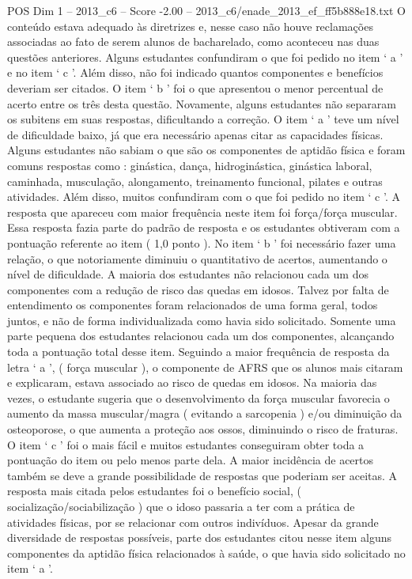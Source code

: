 \begin{textsample}{POS Dim 1 – 2013\_c6 – Score -2.00 – 2013\_c6/enade\_2013\_ef\_ff5b888e18.txt}
O conteúdo estava adequado às diretrizes e, nesse caso não houve reclamações associadas ao fato de serem alunos de bacharelado, como aconteceu nas duas questões anteriores.
Alguns estudantes confundiram o que foi pedido no item ‘ a ’ e no item ‘ c ’.
Além disso, não foi indicado quantos componentes e benefícios deveriam ser citados.
O item ‘ b ’ foi o que apresentou o menor percentual de acerto entre os três desta questão.
Novamente, alguns estudantes não separaram os subitens em suas respostas, dificultando a correção.
O item ‘ a ’ teve um nível de dificuldade baixo, já que era necessário apenas citar as capacidades físicas.
Alguns estudantes não sabiam o que são os componentes de aptidão física e foram comuns respostas como : ginástica, dança, hidroginástica, ginástica laboral, caminhada, musculação, alongamento, treinamento funcional, pilates e outras atividades.
Além disso, muitos confundiram com o que foi pedido no item ‘ c ’.
A resposta que apareceu com maior frequência neste item foi força/força muscular.
Essa resposta fazia parte do padrão de resposta e os estudantes obtiveram com a pontuação referente ao item ( 1,0 ponto ).
No item ‘ b ’ foi necessário fazer uma relação, o que notoriamente diminuiu o quantitativo de acertos, aumentando o nível de dificuldade.
A maioria dos estudantes não relacionou cada um dos componentes com a redução de risco das quedas em idosos.
Talvez por falta de entendimento os componentes foram relacionados de uma forma geral, todos juntos, e não de forma individualizada como havia sido solicitado.
Somente uma parte pequena dos estudantes relacionou cada um dos componentes, alcançando toda a pontuação total desse item.
Seguindo a maior frequência de resposta da letra ‘ a ’, ( força muscular ), o componente de AFRS que os alunos mais citaram e explicaram, estava associado ao risco de quedas em idosos.
Na maioria das vezes, o estudante sugeria que o desenvolvimento da força muscular favorecia o aumento da massa muscular/magra ( evitando a sarcopenia ) e/ou diminuição da osteoporose, o que aumenta a proteção aos ossos, diminuindo o risco de fraturas.
O item ‘ c ’ foi o mais fácil e muitos estudantes conseguiram obter toda a pontuação do item ou pelo menos parte dela.
A maior incidência de acertos também se deve a grande possibilidade de respostas que poderiam ser aceitas.
A resposta mais citada pelos estudantes foi o benefício social, ( socialização/sociabilização ) que o idoso passaria a ter com a prática de atividades físicas, por se relacionar com outros indivíduos.
Apesar da grande diversidade de respostas possíveis, parte dos estudantes citou nesse item alguns componentes da aptidão física relacionados à saúde, o que havia sido solicitado no item ‘ a ’.

\end{textsample}
